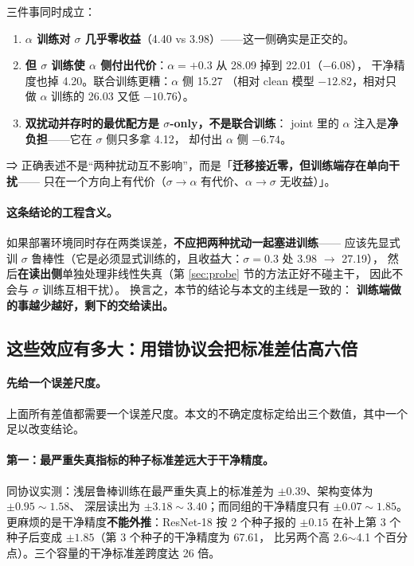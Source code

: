 \documentclass[11pt,a4paper]{ctexart}
\begin{document}
三件事同时成立：

\begin{enumerate}[leftmargin=2em,itemsep=2pt]
  \item \textbf{$\alpha$ 训练对 $\sigma$ 几乎零收益}（4.40 vs 3.98）——这一侧确实是正交的。
  \item \textbf{但 $\sigma$ 训练使 $\alpha$ 侧付出代价}：$\alpha=+0.3$ 从 28.09 掉到 22.01（$-6.08$），
        干净精度也掉 4.20。联合训练更糟：$\alpha$ 侧 15.27
        （相对 clean 模型 $-12.82$，相对只做 $\alpha$ 训练的 26.03 又低 $-10.76$）。
  \item \textbf{双扰动并存时的最优配方是 $\sigma$-only，不是联合训练}：
        joint 里的 $\alpha$ 注入是\textbf{净负担}——它在 $\sigma$ 侧只多拿 4.12，
        却付出 $\alpha$ 侧 $-6.74$。
\end{enumerate}

⇒ 正确表述不是“两种扰动互不影响”，而是「\textbf{迁移接近零，但训练端存在单向干扰}——
只在一个方向上有代价（$\sigma\to\alpha$ 有代价、$\alpha\to\sigma$ 无收益）」。

\paragraph{这条结论的工程含义。}
如果部署环境同时存在两类误差，\textbf{不应把两种扰动一起塞进训练}——
应该先显式训 $\sigma$ 鲁棒性（它是必须显式训练的，且收益大：$\sigma=0.3$ 处 3.98 $\to$ 27.19），
然后\textbf{在读出侧}单独处理非线性失真（第 \ref{sec:probe} 节的方法正好不碰主干，
因此不会与 $\sigma$ 训练互相干扰）。
换言之，本节的结论与本文的主线是一致的：
\textbf{训练端做的事越少越好，剩下的交给读出。}

\subsection{这些效应有多大：用错协议会把标准差估高六倍}
\label{sec:variance}

\paragraph{先给一个误差尺度。}
上面所有差值都需要一个误差尺度。本文的不确定度标定给出三个数值，其中一个足以改变结论。

\paragraph{第一：最严重失真指标的种子标准差远大于干净精度。}
同协议实测：浅层鲁棒训练在最严重失真上的标准差为 $\pm0.39$、架构变体为 $\pm0.95\sim1.58$、
深层读出为 $\pm3.18\sim3.40$；而同组的干净精度只有 $\pm0.07\sim1.85$。
更麻烦的是干净精度\textbf{不能外推}：ResNet-18 按 2 个种子报的 $\pm0.15$
在补上第 3 个种子后变成 $\pm1.85$（第 3 个种子的干净精度为 67.61，
比另两个高 2.6$\sim$4.1 个百分点）。三个容量的干净标准差跨度达 26 倍。
\end{document}
